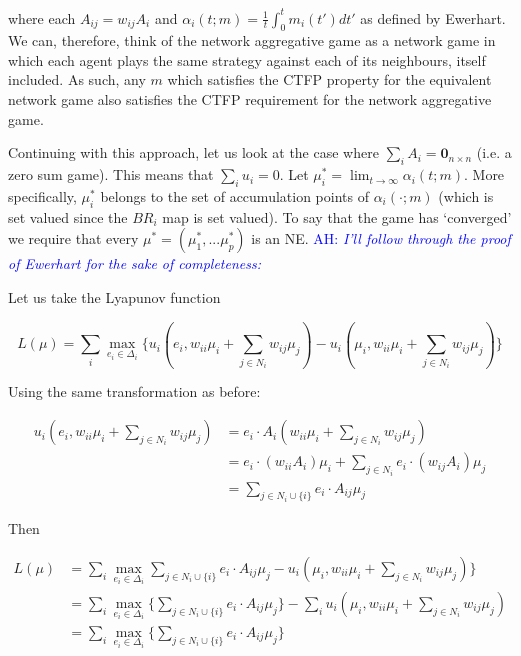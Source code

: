 \documentclass{article}
\theoremstyle{definition}
\newcommand{\ah}[1]{\textcolor{blue}{AH: \textit{#1}}}
\begin{document}
	where each $A_{ij} = w_{ij} A_i$ and $\alpha_i(t; m) =\frac{1}{t} \int_{0}^{t} m_i(t') dt'$ as defined by Ewerhart. We can, therefore, think of the network aggregative game as a network game in which each agent plays the same strategy against each of its neighbours, itself included. As such, any $m$ which satisfies the CTFP property for the equivalent network game also satisfies the CTFP requirement for the network aggregative game. 
	
	Continuing with this approach, let us look at the case where $\sum_i A_i = \textbf{0}_{n\times n}$ (i.e. a zero sum game). This means that $\sum_i u_i = 0$. Let $\mu_i^* = \lim_{t \rightarrow \infty} \alpha_i(t; m)$. More specifically, $\mu_i^*$ belongs to the set of accumulation points of $\alpha_i(\cdot; m)$ (which is set valued since the $BR_i$ map is set valued). To say that the game has `converged' we require that every $\mu^* = (\mu_1^*, ... \mu_p^*)$ is an NE. \ah{I'll follow through the proof of Ewerhart for the sake of completeness: }
	
	Let us take the Lyapunov function
	
	\begin{equation}
		L(\mu) = \sum_i \max_{e_i \in \Delta_i} \{u_i(e_i, w_{ii} \mu_i + \sum_{j \in N_i} w_{ij} \mu_j) - u_i(\mu_i, w_{ii} \mu_i + \sum_{j \in N_i} w_{ij} \mu_j) \}
	\end{equation}
	
	Using the same transformation as before:
	
	\begin{align}
		 u_i(e_i, w_{ii} \mu_i + \sum_{j \in N_i} w_{ij} \mu_j) & =  e_i \cdot A_i (w_{ii} \mu_i + \sum_{j \in N_i} w_{ij} \mu_j) \nonumber \\
		 & =  e_i \cdot (w_{ii} A_i) \mu_i + \sum_{j \in N_i} e_i \cdot (w_{ij} A_i) \mu_j \nonumber \\
		  & =  \sum_{j \in N_i \cup \{i\}} e_i \cdot A_{ij} \mu_j \nonumber 
	\end{align}
	
	Then
	
	\begin{align}
	L(\mu) &= \sum_i \max_{e_i \in \Delta_i}\sum_{j \in N_i \cup \{i\}} e_i \cdot A_{ij} \mu_j  - u_i(\mu_i, w_{ii} \mu_i + \sum_{j \in N_i} w_{ij} \mu_j) \} \nonumber \\
	&= \sum_i \max_{e_i \in \Delta_i} \{\sum_{j \in N_i \cup \{i\}} e_i \cdot A_{ij} \mu_j  \} - \sum_i  u_i(\mu_i, w_{ii} \mu_i + \sum_{j \in N_i} w_{ij} \mu_j) \nonumber \\
	&= \sum_i \max_{e_i \in \Delta_i} \{\sum_{j \in N_i \cup \{i\}} e_i \cdot A_{ij} \mu_j  \} \nonumber 
	\end{align}
	
\end{document}
